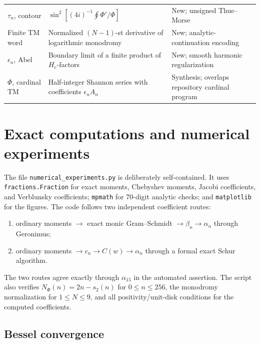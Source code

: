 \documentclass[11pt,oneside]{article}
\theoremstyle{definition}
\begin{document}
\begin{longtable}{p{}p{}p{}}
\(\tau_n\), contour &
\(\sin^2[(4i)^{-1}\oint\Phi'/\Phi]\) &
New; unsigned Thue--Morse\\

Finite TM word &
Normalized \((N-1)\)-st derivative of logarithmic monodromy &
New; analytic-continuation encoding\\

\(\epsilon_n\), Abel &
Boundary limit of a finite product of \(H_r\)-factors &
New; smooth harmonic regularization\\

\(\Phi\), cardinal TM &
Half-integer Shannon series with coefficients \(\epsilon_nA_n\) &
Synthesis; overlaps repository cardinal program\\
\end{longtable}
\normalsize

\section{Exact computations and numerical experiments}
\label{p4:sec:numerics}

The file \texttt{numerical\_experiments.py} is deliberately self-contained. It uses
\texttt{fractions.Fraction} for exact moments, Chebyshev moments, Jacobi coefficients, and
Verblunsky coefficients; \texttt{mpmath} for 70-digit analytic checks; and
\texttt{matplotlib} for the figures. The code follows two independent coefficient routes:

\begin{enumerate}
\item ordinary moments \(\to\) exact monic Gram--Schmidt \(\to\beta_n\to\alpha_n\) through
Geronimus;
\item ordinary moments \(\to c_n\to C(w)\to\alpha_n\) through a formal exact Schur algorithm.
\end{enumerate}

The two routes agree exactly through \(\alpha_{15}\) in the automated assertion. The script
also verifies \(N_\Phi(n)=2n-s_2(n)\) for \(0\le n\le256\), the monodromy normalization for
\(1\le N\le9\), and all positivity/unit-disk conditions for the computed coefficients.



\subsection{Bessel convergence}
\end{document}
